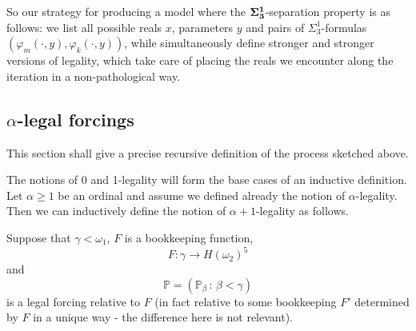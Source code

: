 \documentclass[a4paper,11pt]{article}
\newcommand{\forceP}{\mathbb{P}}
\begin{document}
So our strategy for producing a model where the $\bf{\Sigma^1_3}$-separation property is as follows: we list all possible reals $x$, parameters $y$ and pairs of $\Sigma^1_3$-formulas
$(\varphi_m(\cdot,y), \varphi_k(\cdot,y))$, while simultaneously define stronger and stronger versions of legality, which take care of placing the reals we encounter along the iteration in a non-pathological way.




\subsection{$\alpha$-legal forcings}
This section shall give a precise recursive definition of the
process sketched above. 


The notions of 0 and 1-legality will form the base cases of an inductive definition.
Let $\alpha \ge 1$ be an ordinal and assume we defined already the notion of $\alpha$-legality. Then we can inductively define the notion of $\alpha+1$-legality  as follows.

Suppose that $\gamma < \omega_1$, $F$ is a bookkeeping function,  \[F: \gamma \rightarrow H(\omega_2)^5 \] and \[\forceP=(\forceP_{\beta} \, : \, \beta < \gamma)\] is a legal forcing relative to $F$ (in fact relative to some bookkeeping $F'$ determined by $F$ in a unique way - the difference here is not relevant). 
\end{document}
